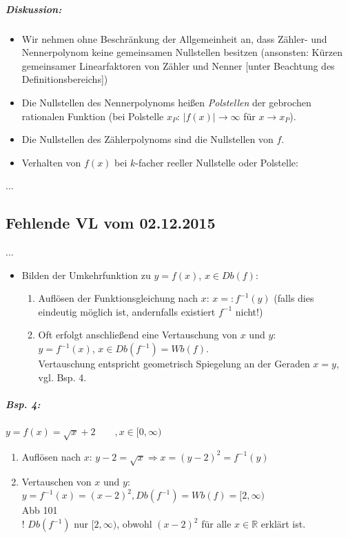 \subparagraph{Diskussion:}
\begin{itemize}
\item Wir nehmen ohne Beschränkung der Allgemeinheit an, dass Zähler- und Nennerpolynom keine gemeinsamen Nullstellen besitzen (ansonsten: Kürzen gemeinsamer Linearfaktoren von Zähler und Nenner [unter Beachtung des Definitionsbereichs])
\item Die Nullstellen des Nennerpolynoms heißen \emph{Polstellen} der gebrochen rationalen Funktion (bei Polstelle $x_P$: $|f(x)|\rightarrow \infty$ für $x\rightarrow x_P$).
\item Die Nullstellen des Zählerpolynoms sind die Nullstellen von $f$.
\item Verhalten von $f(x)$ bei $k$-facher reeller Nullstelle oder Polstelle:\\
\end{itemize}
...
\subsection{Fehlende VL vom 02.12.2015}
...
\begin{itemize}
\item Bilden der Umkehrfunktion zu $y=f(x)$, $x \in Db(f)$:
\begin{enumerate}
\item Auflösen der Funktionsgleichung nach $x$: $x=:f^{-1}(y)$ (falls dies eindeutig möglich ist, andernfalls existiert $f^{-1}$ nicht!)
\item Oft erfolgt anschließend eine Vertauschung von $x$ und $y$:\\
$y=f^{-1}(x)$, $x \in Db(f^{-1})=Wb(f)$.\\
Vertauschung entspricht geometrisch Spiegelung an der Geraden $x=y$, vgl. Bsp. 4.
\end{enumerate}
\end{itemize}
\subparagraph{Bsp. 4:} \parskp
$y=f(x)=\sqrt{x}+2 \qquad , x \in [0,\infty)$
\begin{enumerate}
\item Auflösen nach $x$: $y-2=\sqrt{x}\Rightarrow x=(y-2)^2=f^{-1}(y)$
\item Vertauschen von $x$ und $y$: $y=f^{-1}(x)=(x-2)^2, Db(f^{-1})=Wb(f)=[2,\infty)$\\
Abb 101\\
! $Db(f^{-1})$ nur $[2,\infty)$, obwohl $(x-2)^2$ für alle $x \in \mathbb{R}$ erklärt ist.
\end{enumerate}

